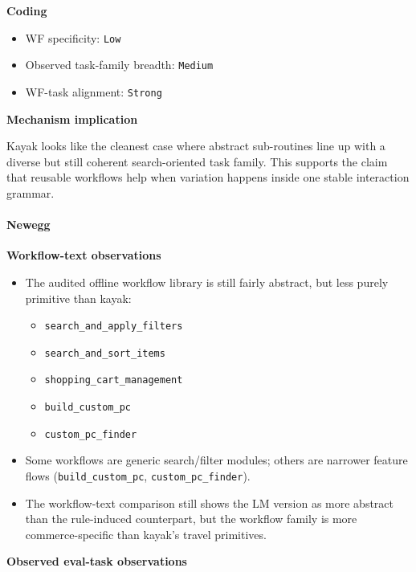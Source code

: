 \textbf{Coding}

\begin{itemize}
\tightlist
\item
  WF specificity: \texttt{Low}
\item
  Observed task-family breadth: \texttt{Medium}
\item
  WF-task alignment: \texttt{Strong}
\end{itemize}

\textbf{Mechanism implication}

Kayak looks like the cleanest case where abstract sub-routines line up
with a diverse but still coherent search-oriented task family. This
supports the claim that reusable workflows help when variation happens
inside one stable interaction grammar.

\paragraph{Newegg}

\textbf{Workflow-text observations}

\begin{itemize}
\tightlist
\item
  The audited offline workflow library is still fairly abstract, but
  less purely
  primitive than kayak:

  \begin{itemize}
  \tightlist
  \item
    \texttt{search\_and\_apply\_filters}
  \item
    \texttt{search\_and\_sort\_items}
  \item
    \texttt{shopping\_cart\_management}
  \item
    \texttt{build\_custom\_pc}
  \item
    \texttt{custom\_pc\_finder}
  \end{itemize}
\item
  Some workflows are generic search/filter modules; others are narrower
  feature flows (\texttt{build\_custom\_pc},
  \texttt{custom\_pc\_finder}).
\item
  The workflow-text comparison still shows the LM version as more
  abstract than the rule-induced counterpart, but the workflow family is
  more commerce-specific than kayak's travel primitives.
\end{itemize}

\textbf{Observed eval-task observations}

